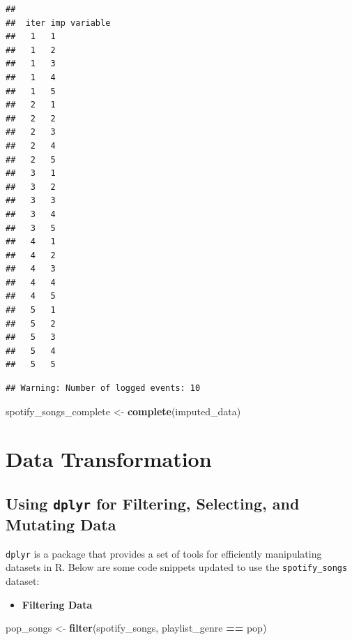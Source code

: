\documentclass[
  b5paper]{book}
\newenvironment{Shaded}{\begin{snugshade}}{\end{snugshade}}
\newcommand{\FunctionTok}[1]{\textcolor[rgb]{0.13,0.29,0.53}{\textbf{#1}}}
\newcommand{\NormalTok}[1]{#1}
\newcommand{\OtherTok}[1]{\textcolor[rgb]{0.56,0.35,0.01}{#1}}
\newcommand{\SpecialCharTok}[1]{\textcolor[rgb]{0.81,0.36,0.00}{\textbf{#1}}}
\newcommand{\StringTok}[1]{\textcolor[rgb]{0.31,0.60,0.02}{#1}}
\providecommand{\tightlist}{%
  \setlength{\itemsep}{0pt}\setlength{\parskip}{0pt}}
\begin{document}
\begin{verbatim}
## 
##  iter imp variable
##   1   1
##   1   2
##   1   3
##   1   4
##   1   5
##   2   1
##   2   2
##   2   3
##   2   4
##   2   5
##   3   1
##   3   2
##   3   3
##   3   4
##   3   5
##   4   1
##   4   2
##   4   3
##   4   4
##   4   5
##   5   1
##   5   2
##   5   3
##   5   4
##   5   5
\end{verbatim}

\begin{verbatim}
## Warning: Number of logged events: 10
\end{verbatim}

\begin{Shaded}
\begin{Highlighting}[]
\NormalTok{spotify\_songs\_complete }\OtherTok{\textless{}{-}} \FunctionTok{complete}\NormalTok{(imputed\_data)}
\end{Highlighting}
\end{Shaded}

\hypertarget{data-transformation}{%
\section{Data Transformation}\label{data-transformation}}

\hypertarget{using-dplyr-for-filtering-selecting-and-mutating-data}{%
\subsection{\texorpdfstring{Using \texttt{dplyr} for Filtering, Selecting, and Mutating Data}{Using dplyr for Filtering, Selecting, and Mutating Data}}\label{using-dplyr-for-filtering-selecting-and-mutating-data}}

\texttt{dplyr} is a package that provides a set of tools for efficiently manipulating datasets in R. Below are some code snippets updated to use the \texttt{spotify\_songs} dataset:

\begin{itemize}
\tightlist
\item
  \textbf{Filtering Data}
\end{itemize}

\begin{Shaded}
\begin{Highlighting}[]
\NormalTok{pop\_songs }\OtherTok{\textless{}{-}} \FunctionTok{filter}\NormalTok{(spotify\_songs, playlist\_genre }\SpecialCharTok{==} \StringTok{\textquotesingle{}pop\textquotesingle{}}\NormalTok{)}
\end{Highlighting}
\end{Shaded}
\end{document}
